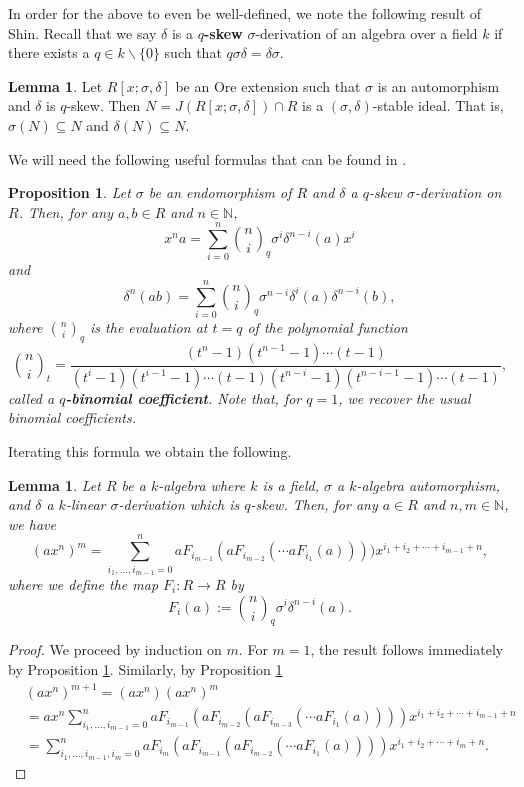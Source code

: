\documentclass[12pt]{amsart}
\newtheorem{prop}[thm]{Proposition}
\newtheorem{lem}[thm]{Lemma}
\theoremstyle{definition}
\theoremstyle{definition}
\theoremstyle{definition}
\theoremstyle{remark}
\theoremstyle{definition}
\newtheorem*{lem*}{Lemma}
\begin{document}
In order for the above to even be well-defined, we note the following result of Shin. Recall that we say $\delta$ is a \textbf{$q$-skew} $\sigma$-derivation of an algebra over a field $k$ if there exists a $q\in k\backslash\{0\}$ such that $q\sigma\delta = \delta\sigma$.

\begin{lem*}\cite[Lemma 1 \& 2]{shin2024jacobsonradicalsoreextensions}
    Let $R[x;\sigma,\delta]$ be an Ore extension such that $\sigma$ is an automorphism and $\delta$ is $q$-skew. Then $N = J(R[x;\sigma,\delta])\cap R$ is a $(\sigma,\delta)$-stable ideal. That is, $\sigma(N)\subseteq N$ and $\delta(N)\subseteq N$.
\end{lem*}

We will need the following useful formulas that can be found in \cite[Section 2.5]{Goodearlformula}.

\begin{prop}\cite[Section 2.5]{Goodearlformula}
\label{GoodearlFormula}
    Let $\sigma$ be an endomorphism of $R$ and $\delta$ a $q$-skew $\sigma$-derivation on $R$. Then, for any $a,b \in R$ and $n \in \mathbb{N}$,\[
        x^na = \sum_{i=0}^n \binom{n}{i}_q \sigma^i\delta^{n-i}(a)x^i
    \]
    and\[
        \delta^n(ab)=\sum_{i=0}^n\binom{n}{i}_q \sigma^{n-i}\delta^i(a)\delta^{n-i}(b),
    \] where $\binom{n}{i}_q$ is the evaluation at $t=q$ of the polynomial function \[
        \binom{n}{i}_t = \frac{(t^n-1)(t^{n-1}-1)\cdots(t-1)}{(t^i-1)(t^{i-1}-1)\cdots(t-1)(t^{n-i}-1)(t^{n-i-1}-1)\cdots(t-1)},
    \]called a \textbf{$q$-binomial coefficient}. Note that, for $q=1$, we recover the usual binomial coefficients.
\end{prop}

Iterating this formula we obtain the following.

\begin{lem}
    \label{iteratedgoodearlformula}Let $R$ be a $k$-algebra where $k$ is a field, $\sigma$ a $k$-algebra automorphism, and $\delta$ a $k$-linear
    $\sigma$-derivation which is $q$-skew. Then, for any $a \in R$ and $n,m \in \mathbb{N}$, we have\[
    (ax^n)^m = \sum_{i_1,\dots,i_{m-1} = 0}^n aF_{i_{m-1}}(aF_{i_{m-2}}(\cdots aF_{i_1}(a))))x^{i_1+i_2+\cdots+i_{m-1}+n},
    \] where we define the map $F_i:R \to R$ by \[
        F_i(a):= \binom{n}{i}_q\sigma^i\delta^{n-i}(a).
    \]
\end{lem}

\begin{proof}
    We proceed by induction on $m$. For $m=1$, the result follows immediately by Proposition \ref{GoodearlFormula}. Similarly, by Proposition \ref{GoodearlFormula}\begin{align*}
        &(ax^n)^{m+1} = (ax^n)(ax^n)^m \\&=  ax^n\sum_{i_1,\dots,i_{m-1} = 0}^n aF_{i_{m-1}}(aF_{i_{m-2}}(aF_{i_{m-3}}(\cdots aF_{i_1}(a))))x^{i_1+i_2+\cdots+i_{m-1}+n}\\&= \sum^n_{i_1,\dots,i_{m-1},i_m = 0}aF_{i_{m}}(aF_{i_{m-1}}(aF_{i_{m-2}}(\cdots aF_{i_1}(a))))x^{i_1+i_2+\cdots+i_{m}+n}.
    \end{align*}
\end{proof}
\end{document}
